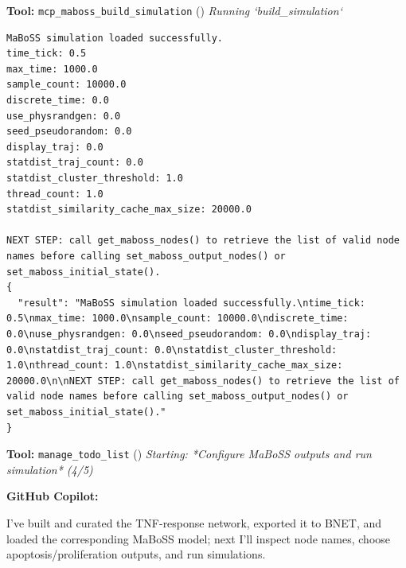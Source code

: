 \documentclass[11pt,a4paper]{article}
\begin{document}
\begin{toolokbox}
\textbf{Tool:} \texttt{mcp\_maboss\_build\_simulation} (\checkmark)
\textit{Running `build\_simulation`}
\begin{lstlisting}
MaBoSS simulation loaded successfully.
time_tick: 0.5
max_time: 1000.0
sample_count: 10000.0
discrete_time: 0.0
use_physrandgen: 0.0
seed_pseudorandom: 0.0
display_traj: 0.0
statdist_traj_count: 0.0
statdist_cluster_threshold: 1.0
thread_count: 1.0
statdist_similarity_cache_max_size: 20000.0

NEXT STEP: call get_maboss_nodes() to retrieve the list of valid node names before calling set_maboss_output_nodes() or set_maboss_initial_state().
{
  "result": "MaBoSS simulation loaded successfully.\ntime_tick: 0.5\nmax_time: 1000.0\nsample_count: 10000.0\ndiscrete_time: 0.0\nuse_physrandgen: 0.0\nseed_pseudorandom: 0.0\ndisplay_traj: 0.0\nstatdist_traj_count: 0.0\nstatdist_cluster_threshold: 1.0\nthread_count: 1.0\nstatdist_similarity_cache_max_size: 20000.0\n\nNEXT STEP: call get_maboss_nodes() to retrieve the list of valid node names before calling set_maboss_output_nodes() or set_maboss_initial_state()."
}
\end{lstlisting}
\end{toolokbox}
\begin{toolokbox}
\textbf{Tool:} \texttt{manage\_todo\_list} (\checkmark)
\textit{Starting: *Configure MaBoSS outputs and run simulation* (4/5)}
\end{toolokbox}
\begin{copilotbox}
\textbf{GitHub Copilot:}

I’ve built and curated the TNF-response network, exported it to BNET, and loaded the corresponding MaBoSS model; next I’ll inspect node names, choose apoptosis/proliferation outputs, and run simulations.

\end{copilotbox}
\end{document}
